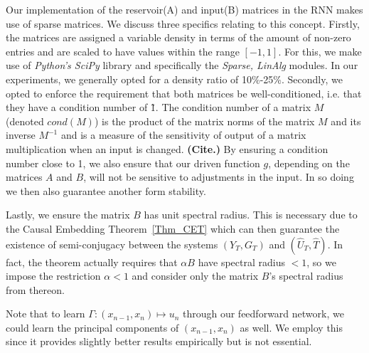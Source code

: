 \documentclass[a4paper,12pt,twoside]{report}
\begin{document}
Our implementation of the reservoir(A) and input(B) matrices in the RNN makes use of sparse matrices. We discuss three specifics relating to this concept. Firstly, the matrices are assigned a variable density in terms of the amount of non-zero entries and are scaled to have values within the range $[-1,1]$. For this, we make use of \textit{Python's SciPy} library and specifically the \textit{Sparse, LinAlg} modules. In our experiments, we generally opted for a density ratio of 10\%-25\%.
Secondly, we opted to enforce the requirement that both matrices be well-conditioned, i.e. that they have a condition number of \~1. The condition number of a matrix $M$ (denoted $cond(M)$) is the product of the matrix norms of the matrix $M$ and its inverse $M^{-1}$ and is a measure of the sensitivity of output of a matrix multiplication when an input is changed. \textbf{(Cite.)} By ensuring a condition number close to 1, we also ensure that our driven function $g$, depending on the matrices $A$ and $B$, will not be sensitive to adjustments in the input. In so doing we then also guarantee another form stability. 

Lastly, we ensure the matrix $B$ has unit spectral radius. This is necessary due to the Causal Embedding Theorem~\ref{Thm_CET} which can then guarantee the existence of semi-conjugacy between the systems $(Y_T, G_T)$ and $(\widehat{U}_T, \widehat{T})$. In fact, the theorem actually requires that $\alpha{B}$ have spectral radius $<1$, so we impose the restriction $\alpha<1$ and consider only the matrix $B$'s spectral radius from thereon.


Note that to learn $\Gamma: (x_{n-1},x_{n}) \mapsto u_n$ through our feedforward network, we could learn the principal components of $(x_{n-1},x_{n})$ as well. 
We employ this since it provides slightly better results empirically but is not essential.
\end{document}
